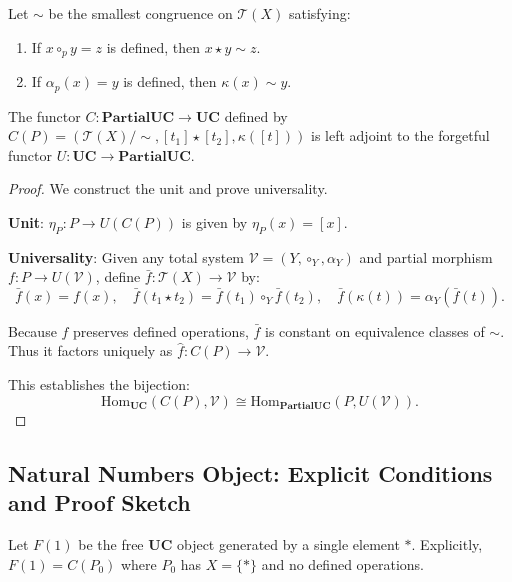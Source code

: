\documentclass[11pt]{article}
\begin{document}
\begin{enumerate}
\begin{definition}
Let $\sim$ be the smallest congruence on $\mathcal{T}(X)$ satisfying:
\begin{enumerate}
    \item If $x \circ_p y = z$ is defined, then $x \star y \sim z$.
    \item If $\alpha_p(x) = y$ is defined, then $\kappa(x) \sim y$.
\end{enumerate}
\end{definition}

\begin{theorem}
The functor $C: \mathbf{PartialUC} \to \mathbf{UC}$ defined by $C(P) = (\mathcal{T}(X)/\sim, [t_1] \star [t_2], \kappa([t]))$ is left adjoint to the forgetful functor $U: \mathbf{UC} \to \mathbf{PartialUC}$.
\end{theorem}

\begin{proof}
We construct the unit and prove universality.

\textbf{Unit}: $\eta_P: P \to U(C(P))$ is given by $\eta_P(x) = [x]$.

\textbf{Universality}: Given any total system $\mathcal{V} = (Y, \circ_Y, \alpha_Y)$ and partial morphism $f: P \to U(\mathcal{V})$, define $\bar{f}: \mathcal{T}(X) \to \mathcal{V}$ by:
\[
\bar{f}(x) = f(x), \quad \bar{f}(t_1 \star t_2) = \bar{f}(t_1) \circ_Y \bar{f}(t_2), \quad \bar{f}(\kappa(t)) = \alpha_Y(\bar{f}(t)).
\]

Because $f$ preserves defined operations, $\bar{f}$ is constant on equivalence classes of $\sim$. Thus it factors uniquely as $\hat{f}: C(P) \to \mathcal{V}$.

This establishes the bijection:
\[
\text{Hom}_{\mathbf{UC}}(C(P), \mathcal{V}) \cong \text{Hom}_{\mathbf{PartialUC}}(P, U(\mathcal{V})).
\]
\end{proof}

\subsection{Natural Numbers Object: Explicit Conditions and Proof Sketch}

\begin{definition}
Let $F(1)$ be the free $\mathbf{UC}$ object generated by a single element $*$. Explicitly, $F(1) = C(P_0)$ where $P_0$ has $X = \{*\}$ and no defined operations.
\end{definition}


\end{enumerate}
\end{document}

